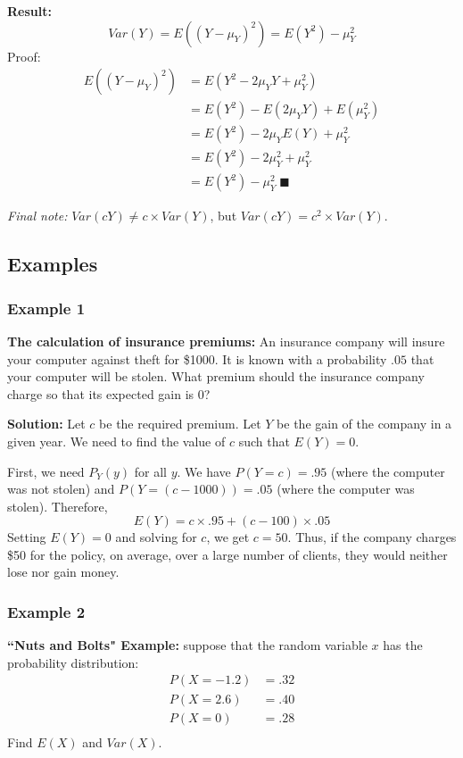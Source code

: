 \documentclass[12pt]{article}
\begin{document}
\textbf{Result:}
\[
    Var(Y) = E((Y - \mu_Y)^2) = E(Y^2) - \mu_Y^2
\]
Proof:
\begin{align*}
    E((Y-\mu_Y)^2) &= E(Y^2 - 2 \mu_Y Y + \mu_Y^2) \\
        &= E(Y^2) - E(2 \mu_Y Y) + E(\mu_Y^2) \\
        &= E(Y^2) - 2 \mu_Y E(Y) + \mu_Y^2 \\
        &= E(Y^2) - 2 \mu_Y^2 + \mu_Y^2 \\
        &= E(Y^2) - \mu_Y^2 \; \blacksquare
\end{align*}

\emph{Final note:} $Var(c Y) \neq c \times Var(Y)$, but $Var(c Y) = c^2 \times Var(Y)$.

\subsection{Examples}
\subsubsection{Example 1}
\textbf{The calculation of insurance premiums:} An insurance company will insure your computer against theft for \$1000. It is known with a probability $.05$ that your computer will be stolen. What premium should the insurance company charge so that its expected gain is 0?

\textbf{Solution:} Let $c$ be the required premium. Let $Y$ be the gain of the company in a given year. We need to find the value of $c$ such that $E(Y) = 0$.

First, we need $P_Y (y)$ for all $y$. We have $P(Y = c) = .95$ (where the computer was not stolen) and $P(Y = (c - 1000)) = .05$ (where the computer was stolen). Therefore,
\[
    E(Y) = c \times .95 + (c - 100) \times .05
\]
Setting $E(Y) = 0$ and solving for $c$, we get $c = 50$. Thus, if the company charges \$50 for the policy, on average, over a large number of clients, they would neither lose nor gain money.

\subsubsection{Example 2}
\textbf{``Nuts and Bolts" Example:} suppose that the random variable $x$ has the probability distribution:
\begin{align*}
    P(X = -1.2) &= .32 \\
    P(X = 2.6)  &= .40 \\
    P(X = 0)    &= .28 \\
\end{align*}
Find $E(X)$ and $Var(X)$.
\end{document}
